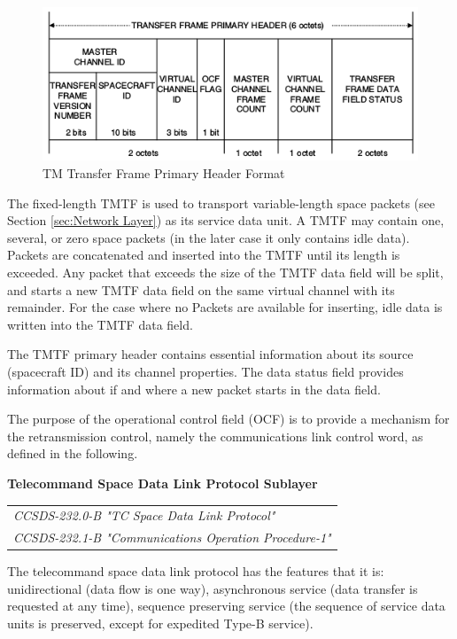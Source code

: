 \begin{figure}[h]
\centering\includegraphics[scale=0.6]{fig/tm_transfer_frame_primary_header_format}
\caption{TM Transfer Frame Primary Header Format}
\label{fig:TM Transfer Frame Primary Header Format}
\end{figure}

The fixed-length TMTF is used to transport variable-length space packets (see Section \ref{sec:Network Layer}) as its service data unit. A TMTF may contain one, several, or zero space packets (in the later case it only contains idle data). Packets are concatenated and inserted into the TMTF until its length is exceeded. Any packet that exceeds the size of the TMTF data field will be split, and starts a new TMTF data field on the same virtual channel with its remainder. For the case where no Packets are available for inserting, idle data is written into the TMTF data field.

The TMTF primary header contains essential information about its source (spacecraft ID) and its channel properties. The data status field provides information about if and where a new packet starts in the data field.

The purpose of the operational control field (OCF) is to provide a mechanism for the retransmission control, namely the communications link control word, as defined in the following.

\textbf{Telecommand Space Data Link Protocol Sublayer}

\begin{tabular}{l}
\textit{CCSDS-232.0-B "TC Space Data Link Protocol" \cite{CCSDS-232.0-B}} \\
\textit{CCSDS-232.1-B "Communications Operation Procedure-1" \cite{CCSDS-232.1-B}}
\end{tabular}

The telecommand space data link protocol has the features that it is: unidirectional (data flow is one way), asynchronous service (data transfer is requested at any time), sequence preserving service (the sequence of service data units is preserved, except for expedited Type-B service).

